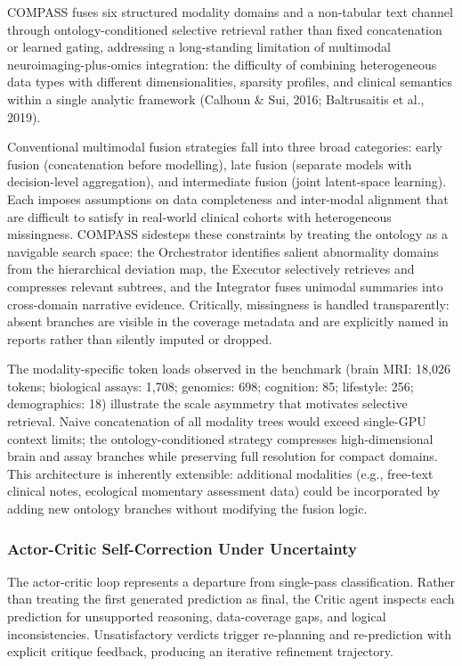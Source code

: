 \documentclass[11pt,a4paper,twoside]{article}
\begin{document}
COMPASS fuses six structured modality domains and a non-tabular text channel through ontology-conditioned selective retrieval rather than fixed concatenation or learned gating, addressing a long-standing limitation of multimodal neuroimaging-plus-omics integration: the difficulty of combining heterogeneous data types with different dimensionalities, sparsity profiles, and clinical semantics within a single analytic framework (Calhoun \& Sui, 2016; Baltrusaitis et al., 2019).

Conventional multimodal fusion strategies fall into three broad categories: early fusion (concatenation before modelling), late fusion (separate models with decision-level aggregation), and intermediate fusion (joint latent-space learning). Each imposes assumptions on data completeness and inter-modal alignment that are difficult to satisfy in real-world clinical cohorts with heterogeneous missingness. COMPASS sidesteps these constraints by treating the ontology as a navigable search space: the Orchestrator identifies salient abnormality domains from the hierarchical deviation map, the Executor selectively retrieves and compresses relevant subtrees, and the Integrator fuses unimodal summaries into cross-domain narrative evidence. Critically, missingness is handled transparently: absent branches are visible in the coverage metadata and are explicitly named in reports rather than silently imputed or dropped.

The modality-specific token loads observed in the benchmark (brain MRI: 18,026 tokens; biological assays: 1,708; genomics: 698; cognition: 85; lifestyle: 256; demographics: 18) illustrate the scale asymmetry that motivates selective retrieval. Naive concatenation of all modality trees would exceed single-GPU context limits; the ontology-conditioned strategy compresses high-dimensional brain and assay branches while preserving full resolution for compact domains. This architecture is inherently extensible: additional modalities (e.g., free-text clinical notes, ecological momentary assessment data) could be incorporated by adding new ontology branches without modifying the fusion logic.

\subsubsection{Actor-Critic Self-Correction Under Uncertainty}

The actor-critic loop represents a departure from single-pass classification. Rather than treating the first generated prediction as final, the Critic agent inspects each prediction for unsupported reasoning, data-coverage gaps, and logical inconsistencies. Unsatisfactory verdicts trigger re-planning and re-prediction with explicit critique feedback, producing an iterative refinement trajectory.
\end{document}
